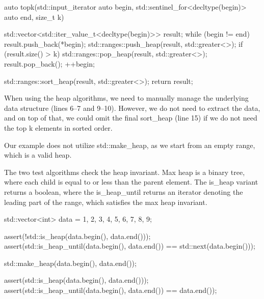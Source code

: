 \begin{box-note}
\begin{cppcode}
auto topk(std::input_iterator auto begin, std::sentinel_for<decltype(begin)> auto end, 
          size_t k) {
          
    std::vector<std::iter_value_t<decltype(begin)>> result;
    while (begin != end) {
        result.push_back(*begin);
        std::ranges::push_heap(result, std::greater<>{});
        if (result.size() > k) {
            std::ranges::pop_heap(result, std::greater<>{});
            result.pop_back();
        }
        ++begin;
    }
    
    std::ranges::sort_heap(result, std::greater<>{});
    return result;    
}
\end{cppcode}
\end{box-note}

When using the heap algorithms, we need to manually manage the underlying data structure (lines 6–7 and 9–10). However, we do not need to extract the data, and on top of that, we could omit the final sort\_heap (line 15) if we do not need the top k elements in sorted order.

Our example does not utilize std::make\_heap, as we start from an empty range, which is a valid heap.



The two test algorithms check the heap invariant. Max heap is a binary tree, where each child is equal to or less than the parent element. The is\_heap variant returns a boolean, where the is\_heap\_until returns an iterator denoting the leading part of the range, which satisfies the max heap invariant.

\begin{box-note}
\begin{cppcode}
std::vector<int> data = {1, 2, 3, 4, 5, 6, 7, 8, 9};

assert(!std::is_heap(data.begin(), data.end()));
assert(std::is_heap_until(data.begin(), data.end()) == std::next(data.begin()));

std::make_heap(data.begin(), data.end());

assert(std::is_heap(data.begin(), data.end()));
assert(std::is_heap_until(data.begin(), data.end()) == data.end());
\end{cppcode}
\end{box-note}

